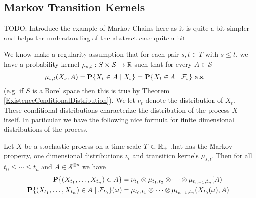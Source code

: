 \subsection{Markov Transition Kernels}
 
TODO: Introduce the example of Markov Chains here as it is quite a bit
simpler and helps the
understanding of the abstract case quite a bit.

We know make a regularity assumption that for each pair $s,t \in T$
with $s \leq t$, we
have a probability kernel $\mu_{s,t} : S \times \mathcal{S} \to
\reals$ such that for every $A \in \mathcal{S}$
\begin{align*}
\mu_{s,t}(X_s, A) &= \cprobability{X_s}{X_t \in A} =
\cprobability{\mathcal{F}_s}{X_t \in A} \text{ a.s.}
\end{align*}
(e.g. if $S$ is a Borel space then this is true by Theorem
\ref{ExistenceConditionalDistribution}).
We let $\nu_t$ denote the distribution of $X_t$.
These conditional distributions characterize the distribution of the
process $X$ itself.  In particular we have the following nice formula
for finite dimensional distributions of the process.
\begin{lem}\label{MarkovDistributions}Let $X$ be a stochastic process
  on a time scale $T \subset \reals_+$ that has the Markov property,
  one dimensional distributions $\nu_t$ and transition kernels
  $\mu_{s,t}$.  Then for all $t_0 \leq \cdots \leq t_n$ and $A \in
  \mathcal{S}^{\otimes n}$ we have
\begin{align*}
\probability{(X_{t_1}, \dots, X_{t_n}) \in A} 
&= \nu_{t_1} \otimes
\mu_{t_1, t_2} \otimes \cdots \otimes \mu_{t_{n-1},t_n}(A) \\
\cprobability{\mathcal{F}_{t_0}}{(X_{t_1}, \dots, X_{t_n}) \in
  A}(\omega) 
&= \mu_{t_0, t_1} \otimes \cdots \otimes \mu_{t_{n-1},t_n}(X_{t_0}(\omega),A) \\
\end{align*}
\end{lem}

